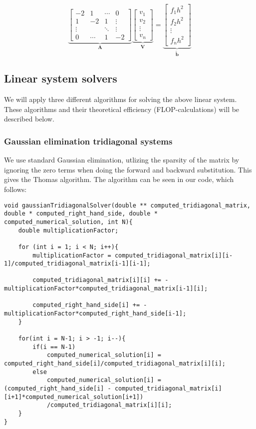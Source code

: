 \documentclass{article}
\begin{document}
\begin{equation}
\underbrace{\begin{bmatrix} -2 & 1 & \cdots & 0 \\ 1 & -2 & 1 & \vdots \\
\vdots & &  \ddots & \vdots \\ 
0 & \cdots & 1 & -2 \end{bmatrix}}_{\mathbf{A}} 
\underbrace{\begin{bmatrix} v_1\\ v_2 \\ \vdots\\ v_n \end{bmatrix}}_{\mathbf{V}} = 
\underbrace{\begin{bmatrix} f_1 h^2\\ f_2 h^2 \\ \vdots \\ f_nh^2\end{bmatrix}}_{\mathbf{\tilde{b}}}
\end{equation}

\subsection{Linear system solvers}
We will apply three different algorithms for solving the above linear system. These algorithms and their theoretical efficiency (FLOP-calculations) will be described below.

\subsubsection{Gaussian elimination tridiagonal systems}
We use standard Gaussian elimination, utlizing the sparsity of the matrix by ignoring the zero terms when doing the forward and backward substitution. This gives the Thomas algorithm. The algorithm can be seen in our code, which follows:

\begin{lstlisting}
void gaussianTridiagonalSolver(double ** computed_tridiagonal_matrix, double * computed_right_hand_side, double * computed_numerical_solution, int N){
	double multiplicationFactor;
	
	for (int i = 1; i < N; i++){
		multiplicationFactor = computed_tridiagonal_matrix[i][i-1]/computed_tridiagonal_matrix[i-1][i-1];

		computed_tridiagonal_matrix[i][i] += - multiplicationFactor*computed_tridiagonal_matrix[i-1][i];

		computed_right_hand_side[i] += - multiplicationFactor*computed_right_hand_side[i-1];
	}
	
	for(int i = N-1; i > -1; i--){
		if(i == N-1)
			computed_numerical_solution[i] = computed_right_hand_side[i]/computed_tridiagonal_matrix[i][i];
		else
			computed_numerical_solution[i] = (computed_right_hand_side[i] - computed_tridiagonal_matrix[i][i+1]*computed_numerical_solution[i+1])
			/computed_tridiagonal_matrix[i][i];
	}
}
\end{lstlisting}
\end{document}
